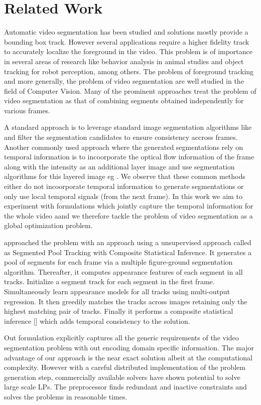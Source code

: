 \section{Related Work}

Automatic video segmentation has been studied and solutions mostly provide a 
bounding box track. However several applications require a higher fidelity 
track to accurately localize the foreground in the video. This problem is of 
importance in several areas of research like behavior analysis in animal studies and object tracking for robot perception, among others.  The problem of foreground tracking and more generally, the problem of video segmentation are well studied in the field of Computer Vision. Many of the prominent approaches treat the problem of video segmentation as that of combining segments obtained independently for various frames. 

A standard approach is to leverage standard image segmentation algorithms like \cite{CPMC} and filter the segmentation candidates to ensure consistency accross frames. Another commonly used approach where the generated segmentations rely on temporal information is to incoorporate the optical flow information of the frame along with the intensity as an additional layer image and use segmentation algorithms for this layered image eg \cite{LeordeanuSS12}. We observe that these common methods either do not incoorporate temporal information to generate segmentations or only use local temporal signals (from the next frame). In this work we aim to experiment with formulations which jointly capture the temporal information for the whole video aand we therefore tackle the problem of video segmentation as a global optimization problem.

\cite{li2013video} approached the problem with an approach using a unsupervised
approach called as Segmented Pool Tracking with Composite Statistical Inference.
It generates a pool of segments for each frame via a multiple figure-ground segmentation algorithm. Thereafter, it computes appearance features of each segment in all tracks. Initialize a segment track for each segment in the first frame. Simultaneously learn appearance models for all tracks using multi-output regression. 
It then greedily matches the tracks across images retaining only the highest matching pair of tracks. Finally it performs a composite statistical inference [\cite{li2013Composite}] which adds temporal consistency to the solution.

Out formulation explicitly captures all the generic requirements of the video
 segmentation problem with out encoding domain specific information. The major 
 advantage of our approach is the near exact solution albeit at the computational complexity. However with a careful distributed implementation of the problem
  generation step, commercially available solvers have shown potential to solve
  large scale LPs. The preprocessor finds redundant and inactive constraints and 
  solves the problems in reasonable times. 
